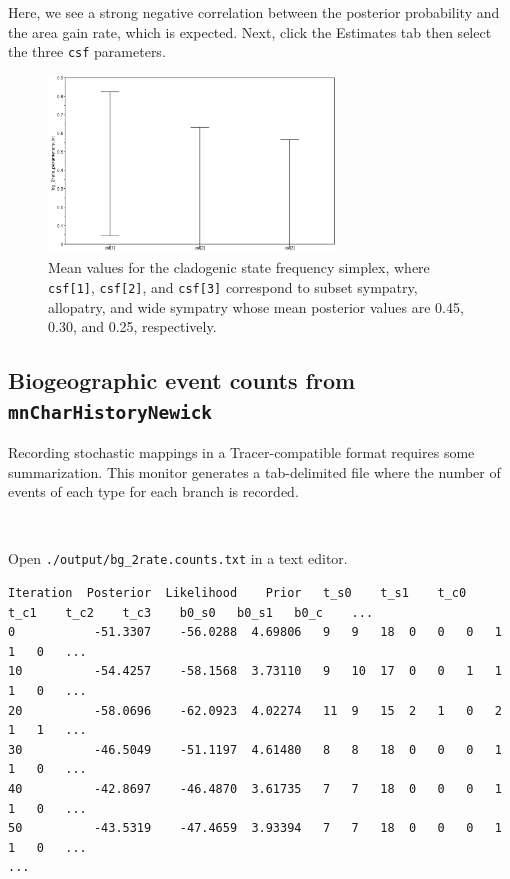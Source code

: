 \documentclass[11pt]{article}
\newcommand{\impmark}{\strut\vadjust{\domark}}
\newcommand{\domark}{%
  \vbox to 0pt{
    \kern-\dp\strutbox
    \smash{\llap{$\rightarrow$\kern1em}}
    \vss
  }%
}
\begin{document}
Here, we see a strong negative correlation between the posterior probability and the area gain rate, which is expected.
Next, click the Estimates tab then select the three {\tt csf} parameters.

\begin{figure}[H]
\centering
\includegraphics[width=3in]{figures/clado_freq_posterior}
\caption{Mean values for the cladogenic state frequency simplex, where {\tt csf[1]}, {\tt csf[2]}, and {\tt csf[3]} correspond to subset sympatry, allopatry, and wide sympatry whose mean posterior values are 0.45, 0.30, and 0.25, respectively.}
\end{figure}


\subsection{Biogeographic event counts from {\tt mnCharHistoryNewick}}

Recording stochastic mappings in a Tracer-compatible format requires some summarization.
This monitor generates a tab-delimited file where the number of events of each type for each branch is recorded.

\noindent \\ \impmark Open {\tt ./output/bg\_2rate.counts.txt} in a text editor.

\begin{framed}
\begin{lstlisting}[basicstyle=\tiny \listingsfont, columns=texcl]
Iteration  Posterior  Likelihood    Prior	t_s0	t_s1	t_c0	t_c1	t_c2	t_c3	b0_s0	b0_s1	b0_c	...
0           -51.3307    -56.0288  4.69806	9	9	18	0	0	0	1	1	0	...	
10          -54.4257    -58.1568  3.73110	9	10	17	0	0	1	1	1	0	...
20          -58.0696    -62.0923  4.02274	11	9	15	2	1	0	2	1	1	...
30          -46.5049    -51.1197  4.61480	8	8	18	0	0	0	1	1	0	...
40          -42.8697    -46.4870  3.61735	7	7	18	0	0	0	1	1	0	...
50          -43.5319    -47.4659  3.93394	7	7	18	0	0	0	1	1	0	...
...
\end{lstlisting}
\end{framed}
\end{document}
